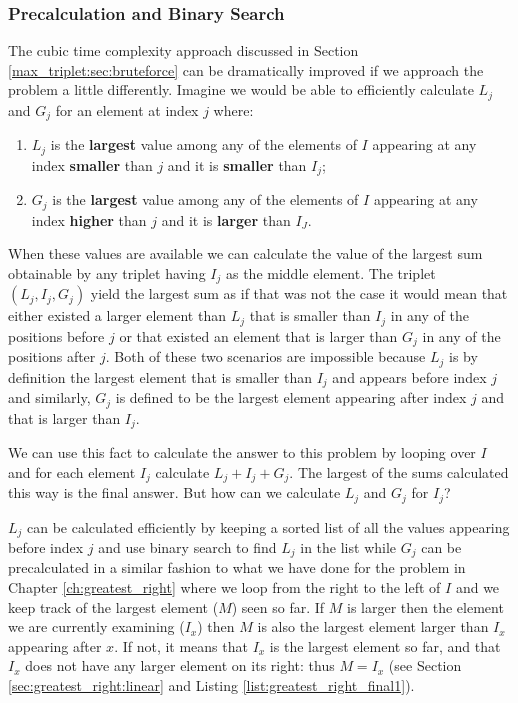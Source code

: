 


\subsubsection{Precalculation and Binary Search}
The cubic time complexity approach discussed in Section \ref{max_triplet:sec:bruteforce} can be
dramatically improved if we approach the problem a little differently. Imagine we would be able to
efficiently calculate $L_j$ and $G_j$ for an element at index $j$ where:
\begin{enumerate}
	\item $L_j$ is the \textbf{largest} value among any of the elements of $I$ appearing at any
	index \textbf{smaller} than $j$ and it is \textbf{smaller} than $I_j$;
	\item $G_j$ is the \textbf{largest} value among any of the elements of $I$ appearing at any
	index \textbf{higher} than $j$ and it is \textbf{larger} than $I_J$.
\end{enumerate}
When these values are available we can calculate the value of the largest sum obtainable by any
triplet having $I_j$  as the middle element. The triplet $(L_j, I_j, G_j)$ yield the largest sum
as if that was not the case it would mean that either existed a larger element than $L_j$ that is smaller
than $I_j$ in any of the positions before $j$ or that existed an element that is larger than $G_j$
in any of the positions after $j$. 
Both of these two scenarios are impossible  because $L_j$ is by
definition the largest element that is smaller than $I_j$ and appears before index $j$  and
similarly,  $G_j$ is defined to be the largest element appearing after index $j$ and that is larger
than $I_j$.

We can use this fact to calculate the answer to this problem by looping over $I$ and for each
element $I_j$ calculate $L_j+ I_j+ G_j$. The largest of the sums calculated this way is the final
answer. But how can we calculate $L_j$ and $G_j$ for $I_j$?

$L_j$ can be calculated efficiently by keeping a sorted list of all the values appearing before
index $j$ and use binary search to find $L_j$ in the list while $G_j$ can be precalculated in a
similar fashion to what we have done for the problem in Chapter \ref{ch:greatest_right} where we loop
from the right to the left of $I$ and we keep track of the largest element ($M$) seen so far. If $M$ is larger
then the element we are currently examining ($I_x$) then $M$ is also the largest element larger than $I_x$ appearing after $x$.
If not, it means that $I_x$ is the largest element so far, and that $I_x$ does not have any larger element on its right: thus $M = I_x$ (see Section \ref{sec:greatest_right:linear} and Listing \ref{list:greatest_right_final1}).
